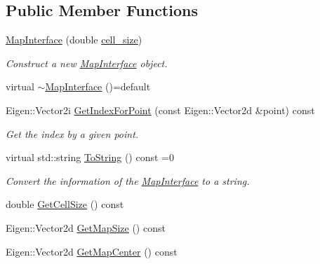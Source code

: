 \subsection*{Public Member Functions}
\begin{DoxyCompactItemize}
\item 
\hyperlink{classMapInterface_a5ecababed14b4918ba90b98eb6b8f6b7}{Map\+Interface} (double \hyperlink{test__match_8cc_a456553c1fc05d94c07e74c5fd45f6621}{cell\+\_\+size})
\begin{DoxyCompactList}\small\item\em Construct a new \hyperlink{classMapInterface}{Map\+Interface} object. \end{DoxyCompactList}\item 
virtual \hyperlink{classMapInterface_aede896827e92298d459e6d51a2095155}{$\sim$\+Map\+Interface} ()=default
\item 
Eigen\+::\+Vector2i \hyperlink{classMapInterface_abda1b7e35d6af9e42ca698c909ba976b}{Get\+Index\+For\+Point} (const Eigen\+::\+Vector2d \&point) const
\begin{DoxyCompactList}\small\item\em Get the index by a given point. \end{DoxyCompactList}\item 
virtual std\+::string \hyperlink{classMapInterface_a87b132e1a619eb21e0ac684fc25f8c74}{To\+String} () const =0
\begin{DoxyCompactList}\small\item\em Convert the information of the \hyperlink{classMapInterface}{Map\+Interface} to a string. \end{DoxyCompactList}\item 
double \hyperlink{classMapInterface_ade05de8aac815c4e54ffdbc82afa2cbc}{Get\+Cell\+Size} () const
\item 
Eigen\+::\+Vector2d \hyperlink{classMapInterface_acfbb86571ebd3fd0404eb238f5a4d52c}{Get\+Map\+Size} () const
\item 
Eigen\+::\+Vector2d \hyperlink{classMapInterface_ad2ab3f050d776762ff6a3b9d7a6a1bc6}{Get\+Map\+Center} () const
\end{DoxyCompactItemize}
